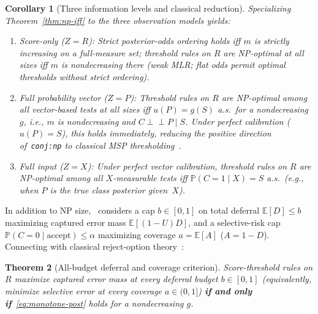 \documentclass[11pt]{article}
\theoremstyle{plain}
\newtheorem{theorem}{Theorem}
\newtheorem{corollary}[theorem]{Corollary}
\theoremstyle{definition}
\theoremstyle{remark}
\begin{document}
\begin{corollary}[Three information levels and classical reduction]\label{cor:levels}
Specializing Theorem~\ref{thm:np-iff} to the three observation models yields:
\begin{enumerate}[label=\textup{(\arabic*)}]
\item \emph{Score-only ($Z = R$):} Strict posterior-odds ordering holds iff $m$ is strictly increasing on a full-measure set; threshold rules on $R$ are NP-optimal at all sizes iff $m$ is nondecreasing there (weak MLR; flat odds permit optimal thresholds without strict ordering).
\item \emph{Full probability vector ($Z = P$):} Threshold rules on $R$ are NP-optimal among all vector-based tests at all sizes iff $u(P) = g(S)$ a.s.\ for a nondecreasing $g$, i.e., $m$ is nondecreasing and $C \perp\!\!\!\perp P \mid S$. Under perfect calibration ($u(P) = S$), this holds immediately, reducing the positive direction of~\texttt{conj:np} to classical MSP thresholding~\cite{Chow1970,Lehmann2005,Franc2023}.
\item \emph{Full input ($Z = X$):} Under perfect vector calibration, threshold rules on $R$ are NP-optimal among all $X$-measurable tests iff $\mathbb{P}(C = 1 \mid X) = S$ a.s.\ (e.g., when $P$ is the true class posterior given~$X$).
\end{enumerate}
\end{corollary}

In addition to NP size,~\cite{Das2025} considers a cap $b \in [0, 1]$ on total deferral $\mathbb{E}[D] \le b$ maximizing captured error mass $\mathbb{E}[(1 - U)D]$, and a selective-risk cap $\mathbb{P}(C = 0 \mid \text{accept}) \le \alpha$ maximizing coverage $a = \mathbb{E}[A]$ ($A = 1 - D$). Connecting with classical reject-option theory~\cite{Chow1970,ElYaniv2010,Franc2023}:

\begin{theorem}[All-budget deferral and coverage criterion]\label{thm:budget-iff}
Score-threshold rules on $R$ maximize captured error mass at every deferral budget $b \in [0, 1]$ (equivalently, minimize selective error at every coverage $a \in (0, 1]$) \textbf{if and only if}~\eqref{eq:monotone-post} holds for a nondecreasing $g$.
\end{theorem}
\end{document}
